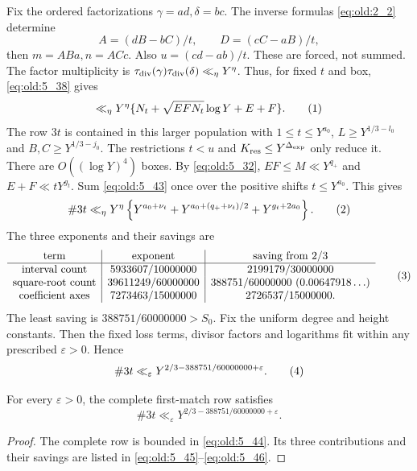 Fix the ordered factorizations \(\gamma=ad,\delta=bc\). The inverse
formulas \eqref{eq:old:2_2} determine
\[
 A=(dB-bC)/t,\qquad D=(cC-aB)/t,
\]
then \(m=ABa,n=ACc\). Also \(u=(cd-ab)/t\). These are forced, not
summed. The factor multiplicity is
\(\tau_{\mathrm{div}}(\gamma)\tau_{\mathrm{div}}(\delta)\ll_\eta Y^\eta\). Thus, for fixed \(t\) and
box, \eqref{eq:old:5_38} gives
\[
 \ll_\eta Y^\eta\{N_t+\sqrt{EFN_t}\log Y+E+F\}.
\AutoTag{eq:old:5_43}
\]
The row \(3t\) is contained in this larger population with
\(1\le t\le Y^{a_0}\), \(L\ge Y^{1/3-l_0}\) and \(B,C\ge Y^{1/3-j_0}\).
The restrictions \(t<u\) and \(K_{\rm res}\le Y^{\Delta_{\rm exp}}\) only reduce it.
There are \(O((\log Y)^4)\) boxes. By \eqref{eq:old:5_32}, \(EF\le M\ll Y^{q_+}\)
and \(E+F\ll tY^{g_t}\). Sum \eqref{eq:old:5_43} once over the positive shifts
\(t\le Y^{a_0}\). This gives
\[
 \#3t\ll_\eta Y^\eta\left\{
 Y^{a_0+\nu_t}
 +Y^{a_0+(q_++\nu_t)/2}
 +Y^{g_t+2a_0}\right\}.
\AutoTag{eq:old:5_44}
\]
The three exponents and their savings are
\[
\begin{array}{c|c|c}
\text{term}&\text{exponent}&\text{saving from }2/3\\ \hline
\text{interval count}&5933607/10000000&2199179/30000000\\
\text{square-root count}&39611249/60000000&388751/60000000\ (0.00647918\ldots)\\
\text{coefficient axes}&7273463/15000000&2726537/15000000 .
\end{array}\AutoTag{eq:old:5_45}
\]
The least saving is \(388751/60000000>S_0\). Fix the uniform degree and height constants. Then the fixed loss terms,
divisor factors and logarithms fit within any prescribed
\(\varepsilon>0\). Hence
\[
 \#3t\ll_\varepsilon
 Y^{2/3-388751/60000000+\varepsilon}.
\AutoTag{eq:old:5_46}
\]
\begin{rowproposition}\label{prop:row-3t}
For every \(\varepsilon>0\), the complete first-match row satisfies
\[
 \#3t\ll_\varepsilon
 Y^{2/3-388751/60000000+\varepsilon}.
\]
\end{rowproposition}
\begin{proof}
The complete row is bounded in \eqref{eq:old:5_44}. Its three contributions and
their savings are listed in \eqref{eq:old:5_45}--\eqref{eq:old:5_46}.
\end{proof}
